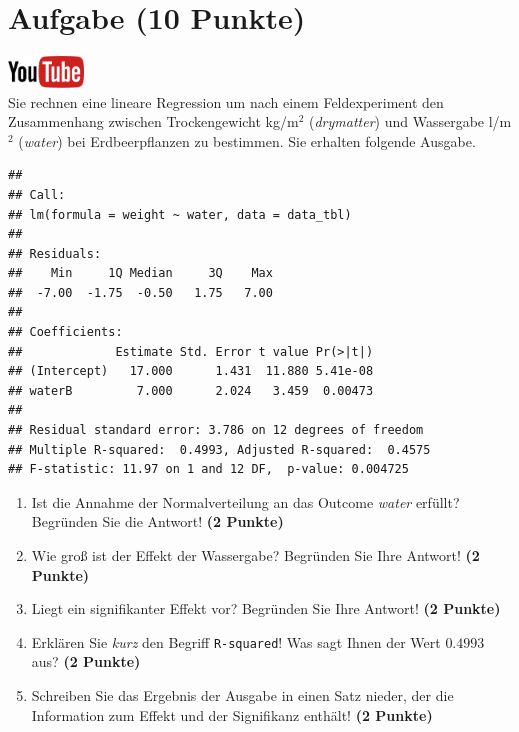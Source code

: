 \documentclass[a4paper, 10pt]{scrartcl}\usepackage[]{graphicx}\usepackage[]{xcolor}
\makeatletter
\newenvironment{kframe}{%
 \def\at@end@of@kframe{}%
 \ifinner\ifhmode%
  \def\at@end@of@kframe{\end{minipage}}%
  \begin{minipage}{\columnwidth}%
 \fi\fi%
 \def\FrameCommand##1{\hskip\@totalleftmargin \hskip-\fboxsep
 \colorbox{shadecolor}{##1}\hskip-\fboxsep
     \hskip-\linewidth \hskip-\@totalleftmargin \hskip\columnwidth}%
 \MakeFramed {\advance\hsize-\width
   \@totalleftmargin\z@ \linewidth\hsize
   \@setminipage}}%
 {\par\unskip\endMakeFramed%
 \at@end@of@kframe}
\newenvironment{knitrout}{}{} %
\makeatother
\begin{document}
\section{Aufgabe \hfill (10 Punkte)}

\hfill\href{https://youtu.be/tNNzcndrpSk}{\includegraphics[width =
  2cm]{img/youtube}}\\[1Ex]

Sie rechnen eine lineare Regression um nach einem Feldexperiment den
Zusammenhang zwischen Trockengewicht kg/m$^2$ (\textit{drymatter}) und
Wassergabe l/m$^2$ (\textit{water}) bei Erdbeerpflanzen zu bestimmen. Sie
erhalten folgende \Rlogo Ausgabe.

\begin{knitrout}
\color{fgcolor}\begin{kframe}
\begin{verbatim}
## 
## Call:
## lm(formula = weight ~ water, data = data_tbl)
## 
## Residuals:
##    Min     1Q Median     3Q    Max 
##  -7.00  -1.75  -0.50   1.75   7.00 
## 
## Coefficients:
##             Estimate Std. Error t value Pr(>|t|)
## (Intercept)   17.000      1.431  11.880 5.41e-08
## waterB         7.000      2.024   3.459  0.00473
## 
## Residual standard error: 3.786 on 12 degrees of freedom
## Multiple R-squared:  0.4993,	Adjusted R-squared:  0.4575 
## F-statistic: 11.97 on 1 and 12 DF,  p-value: 0.004725
\end{verbatim}
\end{kframe}
\end{knitrout}


\begin{enumerate}
\item Ist die Annahme der Normalverteilung an das Outcome \textit{water}
  erf{\"u}llt?  Begr{\"u}nden Sie die Antwort! \textbf{(2 Punkte)}
\item Wie gro{\ss} ist der Effekt der Wassergabe?  Begr{\"u}nden Sie Ihre Antwort! \textbf{(2 Punkte)} 
\item Liegt ein signifikanter
  Effekt vor? Begr{\"u}nden Sie Ihre Antwort! \textbf{(2 Punkte)}
\item Erkl{\"a}ren Sie \textit{kurz} den Begriff \texttt{R-squared}!
  Was sagt Ihnen der Wert $0.4993$ aus? \textbf{(2 Punkte)}
\item Schreiben Sie das Ergebnis der \Rlogo Ausgabe in einen Satz nieder, der die
  Information zum Effekt und der Signifikanz enth{\"a}lt! \textbf{(2 Punkte)} 
\end{enumerate}
 
\end{document}
